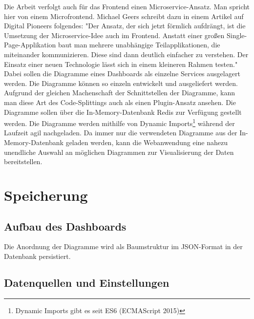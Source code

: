 Die Arbeit verfolgt auch für das Frontend einen Microservice-Ansatz. Man spricht hier von einem
Microfrontend. Michael Geers schreibt dazu in einem Artikel auf Digital Pioneers folgendes:
"Der Ansatz, der sich jetzt förmlich aufdrängt, ist die Umsetzung der Microservice-Idee
auch im Frontend. Anstatt einer ­großen Single-Page-Applikation baut man mehrere unabhängige
Teilapplikationen, die miteinander kommunizieren. Diese sind dann deutlich einfacher zu verstehen.
Der Einsatz einer neuen Technologie lässt sich in einem kleineren Rahmen testen."\cite{MicrofrontendT3N}
Dabei sollen die Diagramme eines Dashboards als einzelne Services ausgelagert werden.
Die Diagramme können so einzeln entwickelt und ausgeliefert werden. Aufgrund der
gleichen Machenschaft der Schnittstellen der Diagramme, kann man diese Art des Code-Splittings auch als
einen Plugin-Ansatz ansehen. Die Diagramme sollen über die In-Memory-Datenbank
Redis zur Verfügung gestellt werden. Die Diagramme werden mithilfe
von Dynamic Imports\footnote{Dynamic Imports gibt es seit ES6 (ECMAScript 2015)\cite{DynamicImportsV8}}
während der Laufzeit agil nachgeladen. Da immer nur die verwendeten Diagramme aus der In-Memory-Datenbank
geladen werden, kann die Webanwendung eine nahezu unendliche Auswahl an möglichen Diagrammen zur Visualisierung
der Daten bereitstellen.

\section{Speicherung}
\label{sec:speicherung}

\subsection{Aufbau des Dashboards}
\label{subsec:aufbaudesdashboards}
Die Anordnung der Diagramme wird als Baumstruktur im JSON-Format in der Datenbank persistiert.

\subsection{Datenquellen und Einstellungen}
\label{subsec:datenquellenundeinstellungen}
